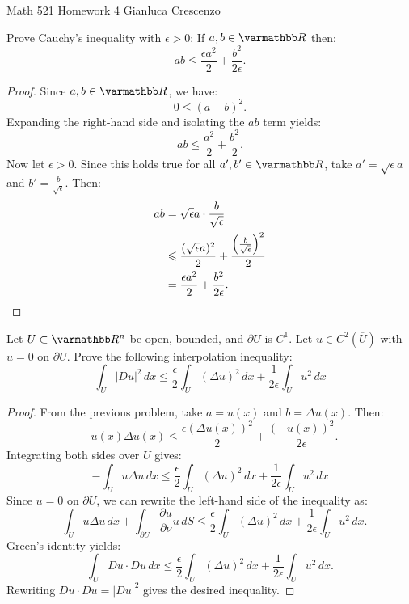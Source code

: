 \documentclass[10pt,oneside,openany]{memoir}
\begin{document}
\homeworktitle
{Math 521} %
{Homework 4} %
{Gianluca Crescenzo} %
\begin{problem}
	Prove Cauchy's inequality with $\epsilon > 0$: If $a,b \in \bfR$ then:
	\[
		ab \leq \frac{\epsilon a^2}{2} + \frac{b^2}{2\epsilon}.
	\] 
\end{problem}
	\begin{proof}
		Since $a,b \in \bfR$, we have:
		\[
			0 \leq (a-b)^2.
		\] 
		Expanding the right-hand side and isolating the $ab$ term yields:
		\[
			ab \leq \frac{a^2}{2} + \frac{b^2}{2}.
		\]
		Now let $\epsilon > 0$. Since this holds true for all $a',b' \in \bfR$, take $a' = \sqrt{\epsilon}a$ and $b' = \frac{b}{\sqrt{\epsilon}}$. Then:
		\begin{align*}
			ab
			&= \sqrt{\epsilon}a \cdot \frac{b}{\sqrt{\epsilon}} \\
			& \leq \frac{(\sqrt{\epsilon}a)^2}{2} + \frac{\left( \frac{b}{\sqrt{\epsilon}} \right)^2}{2} \\
			& = \frac{\epsilon a ^2}{2} + \frac{b^2}{2 \epsilon}. \qedhere
		\end{align*}
	\end{proof}
\begin{problem}
	Let $U \subset \bfR^n$ be open, bounded, and $\partial U$ is $C^1$. Let $u \in C^2(\overline{U})$ with $u = 0$ on $\partial U$. Prove the following interpolation inequality:
	\[
		\int_{U}^{} |Du|^2\,dx \leq \frac{\epsilon}{2} \int_{U}^{} (\Delta u )^2\,dx + \frac{1}{2\epsilon}\int_{U}^{} u^2\,dx
	\] 
\end{problem}
	\begin{proof}
		From the previous problem, take $a = u(x)$ and $b = \Delta u(x)$. Then:
		\[
			-u(x) \Delta u(x) \leq \frac{\epsilon (\Delta u(x))^2}{2} + \frac{(-u(x))^2}{2\epsilon}.
		\]
		Integrating both sides over $U$ gives:
		\[
			- \int_{U}^{} u \Delta u\,dx \leq \frac{\epsilon}{2}\int_{U}^{} (\Delta u)^2\,dx + \frac{1}{2\epsilon} \int_{U}^{} u^2\,dx
		\]
		Since $u = 0$ on $\partial U$, we can rewrite the left-hand side of the inequality as:
		\[
			- \int_{U}^{} u \Delta u\,dx + \int_{\partial U}^{} \frac{\partial u}{\partial \nu}u\,dS \leq \frac{\epsilon}{2}\int_{U}^{} (\Delta u)^2\,dx + \frac{1}{2\epsilon} \int_{U}^{} u^2\,dx.
		\]
		Green's identity yields:
		\[
			\int_{U}^{} Du \cdot Du\,dx \leq \frac{\epsilon}{2}\int_{U}^{} (\Delta u)^2\,dx + \frac{1}{2\epsilon} \int_{U}^{} u^2\,dx.
		\]
		Rewriting $Du \cdot Du = |Du|^2$ gives the desired inequality.
	\end{proof}
\end{document}
